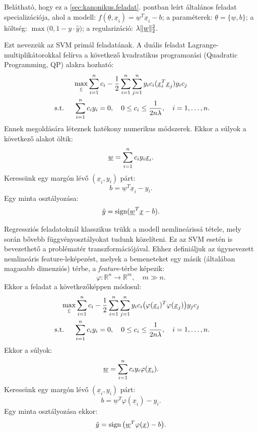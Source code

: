 Belátható, hogy ez a \ref{sec:kanonikus.feladat}. pontban leírt általános feladat specializációja, ahol a modell: $ f(\underline{\theta}, \underline{x}_i) = \underline{w}^T \underline{x}_i - b $; a paraméterek: $ \underline{\theta} = \{\underline{w}, b\} $; a költség: $ \max\big(0, 1 - y \cdot\hat{y}) $; a regularizáció: $ \lambda \lVert\underline{w}\rVert_2^2 $.


Ezt nevezzük az SVM primál feladatának. A duális feladat Lagrange-multiplikátorokkal felírva a következő kvadratikus programozási (Quadratic Programming, QP) alakra hozható:
\begin{multline*}
\max\limits_{\underline{c}} \sum\limits_{i=1}^{n}c_i -  
\frac{1}{2}\sum\limits_{{i}=1}^{n}\sum\limits_{{j}=1}^{n} y_i c_i (\underline{x}_i^T \underline{x}_j) y_i c_j \\
\text{ s.t. } \quad 
\sum\limits_{{i}=1}^{n} c_i y_i = 0, \quad
0 \leq c_i \leq \frac{1}{2n\lambda}, \quad 
i=1,\dots,n.
\end{multline*}
Ennek megoldására léteznek hatékony numerikus módszerek.
Ekkor a súlyok a következő alakot öltik:
\[
\underline{w} = \sum\limits_{{i}=1}^{n} c_i y_i \underline{x}_i.
\]
Keressünk egy margón lévő $ (\underline{x}_i, y_i) $ párt:
\[
b = \underline{w}^T \underline{x}_i  - y_i.
\]
Egy minta osztályozása:
\[
\hat{y} = \operatorname{sign}(\underline{w}^T \underline{x} - b).
\]






Regressziós feladatoknál klasszikus trükk a modell nemlineárissá tétele, mely során bővebb függvényosztályokat tudunk közelíteni. Ez az SVM esetén is bevezethető a problématér 
transzformációjával.
Ehhez definiáljuk az úgynevezett nemlineáris feature-leképezést, melyek a bemeneteket egy másik (általában magasabb dimenziós) térbe,
a \textit{feature}-térbe képezik:
\[
\varphi\colon \mathbb{R}^n \rightarrow \mathbb{R}^m, \quad m \gg n.
\]
Ekkor a feladat a következőképpen módosul:
\begin{multline*}
\max\limits_{\underline{c}} \sum\limits_{i=1}^{n}c_i - 
\frac{1}{2}\sum\limits_{{i}=1}^{n}\sum\limits_{{j}=1}^{n} y_i c_i \big(\varphi(\underline{x}_i)^T \varphi(\underline{x}_j)\big) y_j c_j \\
\text{ s.t. } \quad 
\sum\limits_{{i}=1}^{n} c_i y_i = 0, \quad
0 \leq c_i \leq \frac{1}{2n\lambda}, \quad 
i=1,\dots,n.
\end{multline*}
Ekkor a súlyok:
\[
\underline{w} = \sum\limits_{{i}=1}^{n} c_i y_i \varphi(\underline{x}_i).
\]
Keressünk egy margón lévő $ (\underline{x}_i, y_i) $ párt:
\[
b = \underline{w}^T \varphi(\underline{x}_i)  - y_i.
\]
Egy minta osztályozása ekkor:
\[
\hat{y} = \operatorname{sign} \big(\underline{w}^T \varphi(\underline{x}) - b\big).
\]


